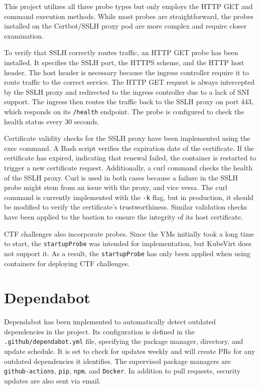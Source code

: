This project utilizes all three probe types but only employs the HTTP GET and command execution methods. While most probes are straightforward, the probes installed on the Certbot/SSLH proxy pod are more complex and require closer examination.

To verify that SSLH correctly routes traffic, an HTTP GET probe has been installed. It specifies the SSLH port, the HTTPS scheme, and the HTTP host header. The host header is necessary because the ingress controller require it to route traffic to the correct service. The HTTP GET request is always intercepted by the SSLH proxy and redirected to the ingress controller due to a lack of SNI support. The ingress then routes the traffic back to the SSLH proxy on port 443, which responds on its \texttt{/health} endpoint. The probe is configured to check the health status every 30 seconds.

Certificate validity checks for the SSLH proxy have been implemented using the exec command. A Bash script verifies the expiration date of the certificate. If the certificate has expired, indicating that renewal failed, the container is restarted to trigger a new certificate request. Additionally, a curl command checks the health of the SSLH proxy. Curl is used in both cases because a failure in the SSLH probe might stem from an issue with the proxy, and vice versa. The curl command is currently implemented with the \texttt{-k} flag, but in production, it should be modified to verify the certificate's trustworthiness. Similar validation checks have been applied to the bastion to ensure the integrity of its host certificate.

CTF challenges also incorporate probes. Since the VMs initially took a long time to start, the \texttt{startupProbe} was intended for implementation, but KubeVirt does not support it. As a result, the \texttt{startupProbe} has only been applied when using containers for deploying CTF challenges.

\section{Dependabot}
Dependabot has been implemented to automatically detect outdated dependencies in the project. Its configuration is defined in the \texttt{.github/dependabot.yml} file, specifying the package manager, directory, and update schedule. It is set to check for updates weekly and will create PRs for any outdated dependencies it identifies. The supervised package managers are \texttt{github-actions}, \texttt{pip}, \texttt{npm}, and \texttt{Docker}. In addition to pull requests, security updates are also sent via email.

